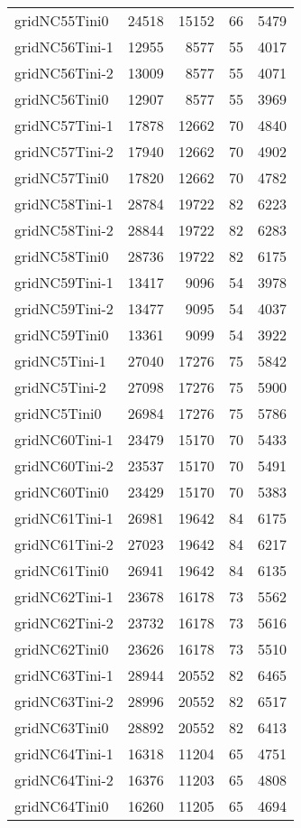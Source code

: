 \begin{longtable}{lrrrr}
gridNC55Tini0 & 24518 & 15152 & 66 & 5479 \\
gridNC56Tini-1 & 12955 & 8577 & 55 & 4017 \\
gridNC56Tini-2 & 13009 & 8577 & 55 & 4071 \\
gridNC56Tini0 & 12907 & 8577 & 55 & 3969 \\
gridNC57Tini-1 & 17878 & 12662 & 70 & 4840 \\
gridNC57Tini-2 & 17940 & 12662 & 70 & 4902 \\
gridNC57Tini0 & 17820 & 12662 & 70 & 4782 \\
gridNC58Tini-1 & 28784 & 19722 & 82 & 6223 \\
gridNC58Tini-2 & 28844 & 19722 & 82 & 6283 \\
gridNC58Tini0 & 28736 & 19722 & 82 & 6175 \\
gridNC59Tini-1 & 13417 & 9096 & 54 & 3978 \\
gridNC59Tini-2 & 13477 & 9095 & 54 & 4037 \\
gridNC59Tini0 & 13361 & 9099 & 54 & 3922 \\
gridNC5Tini-1 & 27040 & 17276 & 75 & 5842 \\
gridNC5Tini-2 & 27098 & 17276 & 75 & 5900 \\
gridNC5Tini0 & 26984 & 17276 & 75 & 5786 \\
gridNC60Tini-1 & 23479 & 15170 & 70 & 5433 \\
gridNC60Tini-2 & 23537 & 15170 & 70 & 5491 \\
gridNC60Tini0 & 23429 & 15170 & 70 & 5383 \\
gridNC61Tini-1 & 26981 & 19642 & 84 & 6175 \\
gridNC61Tini-2 & 27023 & 19642 & 84 & 6217 \\
gridNC61Tini0 & 26941 & 19642 & 84 & 6135 \\
gridNC62Tini-1 & 23678 & 16178 & 73 & 5562 \\
gridNC62Tini-2 & 23732 & 16178 & 73 & 5616 \\
gridNC62Tini0 & 23626 & 16178 & 73 & 5510 \\
gridNC63Tini-1 & 28944 & 20552 & 82 & 6465 \\
gridNC63Tini-2 & 28996 & 20552 & 82 & 6517 \\
gridNC63Tini0 & 28892 & 20552 & 82 & 6413 \\
gridNC64Tini-1 & 16318 & 11204 & 65 & 4751 \\
gridNC64Tini-2 & 16376 & 11203 & 65 & 4808 \\
gridNC64Tini0 & 16260 & 11205 & 65 & 4694 \\

\end{longtable}

